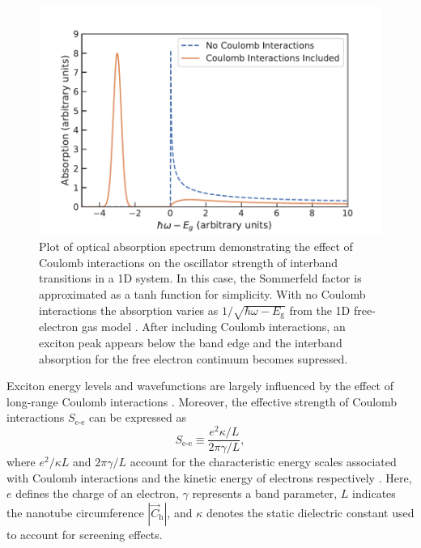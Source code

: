 \begin{figure}[ht]
	\centering
	\includegraphics[scale=0.8]{images/chapter_optical_props/Sommerfeld_Plot/coulomb_enhancement_1d}
	\caption{Plot of optical absorption spectrum demonstrating the effect of Coulomb interactions on the oscillator strength of interband transitions in a 1D system. In this case, the Sommerfeld factor is approximated as a tanh function for simplicity. With no Coulomb interactions the absorption varies as $1/\sqrt{\hbar\omega - E_\text{g}}$ from the 1D free-electron gas model \cite{Ashcroft}. After including Coulomb interactions, an exciton peak appears below the band edge and the interband absorption for the free electron continuum becomes supressed. }
	\label{fig:coulomb_enhancement_1d}
\end{figure}



Exciton energy levels and wavefunctions are largely influenced by the effect of long-range Coulomb interactions \cite{ando2006effects}. Moreover, the effective strength of Coulomb interactions $S_\text{e-e}$ can be expressed as
%
\begin{equation}
	S_\text{e-e} \equiv \dfrac{e^2 \kappa / L}{2 \pi \gamma / L},
\end{equation}
%
where $e^2 /\kappa L$ and $2 \pi \gamma / L$ account for the characteristic energy scales associated with Coulomb interactions and the kinetic energy of electrons respectively \cite{ando2005theory}. Here, $e$ defines the charge of an electron, $\gamma$ represents a band parameter, $L$ indicates the nanotube circumference $|\vec{C}_\text{h}|$, and $\kappa$ denotes the static dielectric constant used to account for screening effects.

